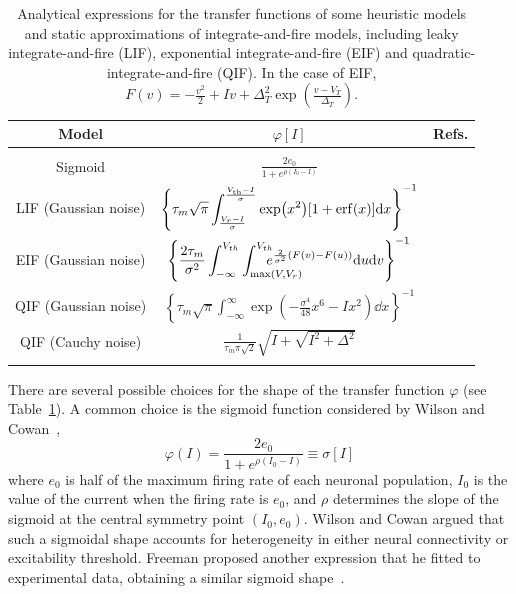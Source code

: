 \documentclass[12pt]{article}
\numberwithin{equation}{section}
\begin{document}
\begin{table}\label{table1} \small
\centering
\begingroup
{}              %
\setlength{\arrayrulewidth}{0.4pt}  %
\begin{tabular}{|c|c|c|} \hline
  \rowcolor{softblue!25}
  \textbf{\color{softblue!60!black} Model} &
  \textbf{\color{softblue!60!black} $\varphi[I]$} &
  \textbf{\color{softblue!60!black} Refs.} \\
  \hline
  & & \\  %
  Sigmoid & $\displaystyle{\frac{2e_0}{1+e^{\rho(I_0-I)}}}$ & \cite{Wilson1972,jansen1995}\\[15pt]
  LIF (Gaussian noise) & $\left\{\displaystyle{\tau_m\sqrt{\pi} \int_\frac{V_r-I}{\sigma}^\frac{V_\text{th}-I}{\sigma} \exp(x^2)[1+\erf(x)]\dd x}\right\}^{-1}$ & \cite{siegert1951,amit1997,brunel1999} \\[15pt]
  EIF (Gaussian noise) & $\displaystyle{\left\{\frac{2\tau_m}{\sigma^2}\int_{-\infty}^{V_{th}}
  \int_{\max(V,V_r)}^{V_{th}}\mkern-32mu\mkern-18mu e^{\frac{2}{\sigma^2}(F(v)-F(u))}
  \dd u \dd v \right\}^{-1} }$ & \cite{fourcaud-trocme2003,fourcaud-trocm2005} \\[15pt]
  QIF (Gaussian noise) & $\displaystyle{\left\{\tau_m\sqrt{\pi} \int_{-\infty}^\infty \exp\left(-\frac{\sigma^4}{48}x^6 - Ix^2 \right) \dd x\right\}^{-1}}$ & \cite{brunel2003a} \\[15pt]
  QIF (Cauchy noise) & $\displaystyle{\frac{1}{\tau_m\pi\sqrt{2}}}\sqrt{I+\sqrt{I^2+\Delta^2}}$ & \cite{montbrio2015,clusella2022a} \\
  & & \\ %
  \hline
\end{tabular}
\endgroup
\caption{Analytical expressions for the transfer functions of some heuristic models and 
static approximations of integrate-and-fire models, including leaky integrate-and-fire (LIF), exponential integrate-and-fire (EIF) and quadratic-integrate-and-fire (QIF). In the case
of EIF, $F(v) = -\frac{v^2}{2} + Iv + \Delta_T^2\exp\left(\frac{v-V_T}{\Delta_T}\right)$.
} \label{table:transfers}
\end{table}


There are several possible choices for the shape
of the transfer function $\varphi$ (see Table~\ref{table:transfers}). 
A common choice is the sigmoid function considered by Wilson and Cowan~\cite{Wilson1972},
\begin{equation}\label{eq:sigmoid}
\varphi(I) = \frac{2e_0}{1+e^{\rho(I_0-I)}} \equiv \sigma [I] 
\end{equation}
where $e_0$ is half of the maximum firing rate of each neuronal population, $I_0$ is the value of the current when the firing rate is $e_0$, and $\rho$ determines the slope of the sigmoid at the central symmetry point $(I_0, e_0)$.
Wilson and Cowan argued that such a sigmoidal shape accounts for heterogeneity in either neural connectivity
or excitability threshold.
Freeman proposed another expression that he fitted to experimental data,
obtaining a similar sigmoid shape~\cite{freeman1975,freeman1979}.
\end{document}

